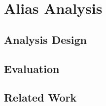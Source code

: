
\chapter{Alias Analysis}
\label{sec:alias}

\section{Analysis Design}

\section{Evaluation}

\section{Related Work}

